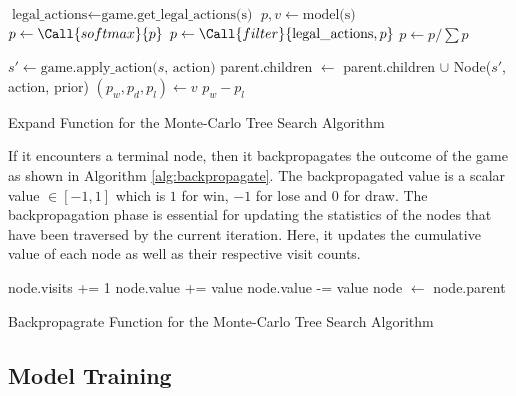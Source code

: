 \begin{algorithm}[H]
    \begin{algorithmic}[1]
            \State $\text{legal\_actions} \gets \text{game.get\_legal\_actions(s)}$
            \State $p, v \gets \text{model(s)}$
            \State $p \gets \Call{softmax}{p}$
            \State $p \gets \Call{filter}{\text{legal\_actions}, p}$
            \State $p \gets p / \sum p$
        
                \State $s' \gets \text{game.apply\_action($s$, action)}$
                \State parent.children $\gets$ parent.children $\cup$ Node($s'$, action, prior)
            \EndFor
            \State $(p_w, p_d, p_l) \gets v$ 
            \State \Return $p_w - p_l$
        \EndFunction
    \end{algorithmic}
    \caption{Expand Function for the Monte-Carlo Tree Search Algorithm}
    \label{alg:expand}
\end{algorithm}

If it encounters a terminal node, then it backpropagates the outcome of the game as shown in Algorithm \ref{alg:backpropagate}. The backpropagated value is a scalar value $\in [-1, 1]$ which is $1$ for win, $-1$ for lose and $0$ for draw. The backpropagation phase is essential for updating the statistics of the nodes that have been traversed by the current iteration. Here, it updates the cumulative value of each node as well as their respective visit counts.

\begin{algorithm}[H]
    \begin{algorithmic}[1]
                \State node.visits += 1
                    \State node.value += value
                \Else
                    \State node.value -= value
                \EndIf
                \State node $\gets$ node.parent
            \EndWhile
        \EndFunction
    \end{algorithmic}
    \caption{Backpropagrate Function for the Monte-Carlo Tree Search Algorithm}
    \label{alg:backpropagate}
\end{algorithm}

\subsection{Model Training}

